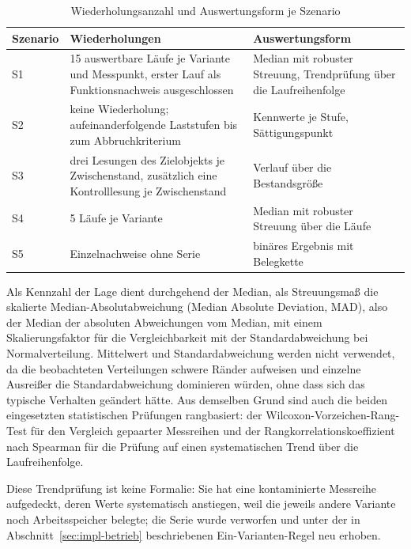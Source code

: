 \begin{table}[htbp]
\renewcommand{\arraystretch}{1.3}
\footnotesize
  \centering
  \caption{Wiederholungsanzahl und Auswertungsform je Szenario}
  \label{tab:impl-wiederholungen}
  \begin{tabular}{p{} p{} p{}}
    \toprule
    \textbf{Szenario} & \textbf{Wiederholungen} & \textbf{Auswertungsform} \\
    \midrule
    S1 & 15 auswertbare Läufe je Variante und Messpunkt, erster Lauf als Funktionsnachweis ausgeschlossen & Median mit robuster Streuung, Trendprüfung über die Laufreihenfolge \\
    S2 & keine Wiederholung; aufeinanderfolgende Laststufen bis zum Abbruchkriterium & Kennwerte je Stufe, Sättigungspunkt \\
    S3 & drei Lesungen des Zielobjekts je Zwischenstand, zusätzlich eine Kontrolllesung je Zwischenstand & Verlauf über die Bestandsgröße \\
    S4 & 5 Läufe je Variante & Median mit robuster Streuung über die Läufe \\
    S5 & Einzelnachweise ohne Serie & binäres Ergebnis mit Belegkette \\
    \bottomrule
  \end{tabular}
\end{table}

Als Kennzahl der Lage dient durchgehend der Median, als Streuungsmaß die skalierte Median-Absolutabweichung (Median Absolute Deviation, MAD), also der Median der absoluten Abweichungen vom Median, mit einem Skalierungsfaktor für die Vergleichbarkeit mit der Standardabweichung bei Normalverteilung. Mittelwert und Standardabweichung werden nicht verwendet, da die beobachteten Verteilungen schwere Ränder aufweisen und einzelne Ausreißer die Standardabweichung dominieren würden, ohne dass sich das typische Verhalten geändert hätte. Aus demselben Grund sind auch die beiden eingesetzten statistischen Prüfungen rangbasiert: der Wilcoxon-Vorzeichen-Rang-Test für den Vergleich gepaarter Messreihen und der Rangkorrelationskoeffizient nach Spearman für die Prüfung auf einen systematischen Trend über die Laufreihenfolge.

Diese Trendprüfung ist keine Formalie: Sie hat eine kontaminierte Messreihe aufgedeckt, deren Werte systematisch anstiegen, weil die jeweils andere Variante noch Arbeitsspeicher belegte; die Serie wurde verworfen und unter der in Abschnitt~\ref{sec:impl-betrieb} beschriebenen Ein-Varianten-Regel neu erhoben.

